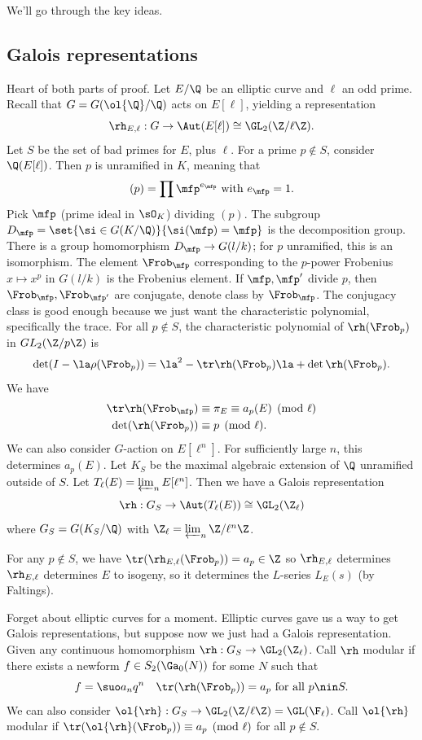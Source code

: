 We'll go through the key ideas.
\subsection{Galois representations}
Heart of both parts of proof. Let $E/\Q$ be an elliptic curve and $\ell$ an odd prime. Recall that $G=G(\ol{\Q}/\Q)$ acts on $E[\ell]$, yielding a representation 
\[
\rh_{E,\ell}:G\to \Aut(E[\ell])\cong \GL_2(\Z/\ell\Z).
\]
Let $S$ be the set of bad primes for $E$, plus $\ell$. For a prime $p\nin S$, consider $\Q(E[\ell])$. Then $p$ is unramified in $K$, meaning that
\[
(p)=\prod \mfp^{e_{\mfp}} \text{ with }e_{\mfp}=1.
\]
Pick $\mfp$ (prime ideal in $\sO_K$) dividing $(p)$. The subgroup $D_{\mfp}=\set{\si\in G(K/\Q)}{\si(\mfp)=\mfp}$ is the decomposition group. There is a group homomorphism $D_{\mfp}\to G(l/k)$; for $p$ unramified, this is an isomorphism. The element $\Frob_{\mfp}$ corresponding to the $p$-power Frobenius $x\mapsto x^p$ in $G(l/k)$ is the Frobenius element. If $\mfp,\mfp'$ divide $p$, then $\Frob_{\mfp},\Frob_{\mfp'}$ are conjugate, denote class by $\Frob_{\mfp}$. The conjugacy class is good enough because we just want the characteristic polynomial, specifically the trace. For all $p\nin S$, the characteristic polynomial of $\rh(\Frob_p)$ in $GL_2(\Z/p\Z)$ is
\[
\det(I-\la \rho(\Frob_p))=\la^2-\tr\rh (\Frob_p)\la +\det\rh(\Frob_p).
\]
We have
\begin{align*}
\tr \rh(\Frob_{\mfp})&\equiv \pi_E\equiv a_p(E)\pmod{\ell}\\
\det(\rh(\Frob_p))&\equiv p\pmod{\ell}.
\end{align*}
We can also consider $G$-action on $E[\ell^n]$. For sufficiently large $n$, this determines $a_p(E)$. Let $K_S$ be the maximal algebraic extension of $\Q$ unramified outside of $S$. Let $T_{\ell}(E)=\varprojlim_n E[\ell^n]$. Then we have a Galois representation
\[
\rh:G_S\to \Aut(T_{\ell}(E))\cong \GL_2(\Z_{\ell})
\]
where $G_S=G(K_S/\Q)$ with $\Z_{\ell}=\varprojlim_n \Z/\ell^n\Z$. %

For any $p\nin S$, we have $\tr(\rh_{E,\ell}(\Frob_p))=a_p\in \Z$ so $\rh_{E,\ell}$ determines $\rh_{E,\ell}$ determines $E$ to isogeny, so it determines the $L$-series $L_E(s)$ (by Faltings).

Forget about elliptic curves for a moment. Elliptic curves gave us a way to get Galois representations, but suppose now we just had a Galois representation. Given any continuous homomorphism $\rh:G_S\to \GL_2(\Z_{\ell})$. Call $\rh$ modular if there exists a newform $f\in S_2(\Ga_0(N))$ for some $N$ such that 
\[
f=\suo a_n q^n\quad \tr(\rh(\Frob_p))=a_p\text{ for all }p\nin S.
\]
We can also consider $\ol{\rh}:G_S\to \GL_2(\Z/\ell \Z)=\GL(\F_{\ell})$. Call $\ol{\rh}$ modular if $\tr(\ol{\rh}(\Frob_p))\equiv a_p\pmod{\ell}$ for all $p\nin S$.


